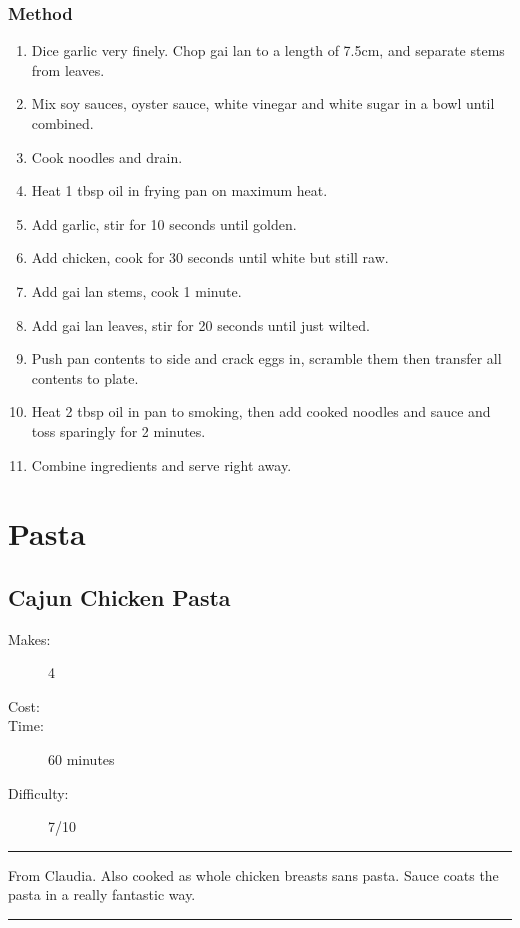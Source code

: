 \documentclass[]{article}
\begin{document}
\subsubsection*{\Large Method}
\begin{enumerate}[font=\huge\color{accent}]
	\item Dice garlic very finely. Chop gai lan to a length of 7.5cm, and separate stems from leaves.
	\item Mix soy sauces, oyster sauce, white vinegar and white sugar in a bowl until combined.
	\item Cook noodles and drain.
	\item Heat 1 tbsp oil in frying pan on maximum heat.
	\item Add garlic, stir for 10 seconds until golden.
	\item Add chicken, cook for 30 seconds until white but still raw.
	\item Add gai lan stems, cook 1 minute.
	\item Add gai lan leaves, stir for 20 seconds until just wilted.
	\item Push pan contents to side and crack eggs in, scramble them then transfer all contents to plate.
	\item Heat 2 tbsp oil in pan to smoking, then add cooked noodles and sauce and toss sparingly for 2 minutes.
	\item Combine ingredients and serve right away.
\end{enumerate}
\newpage
{}
\section*{\center\Huge\color{accent}Pasta}
\label{cat:Pasta}
\label{rec:Cajun Chicken Pasta}
\subsection*{\center\huge Cajun Chicken Pasta}
\begin{description}
\item[Makes:] 4 
\item[Cost:] \textdollar
\item[Time:] 60 minutes
\item[Difficulty:] 7/10
\end{description}
\vspace{0.2cm}\hrule\vspace{0.5cm}
\begin{adjustwidth}{0.5 cm}{0.5 cm}

From Claudia. Also cooked as whole chicken breasts sans pasta. Sauce coats the pasta in a really fantastic way. \hfill\color{accent}{\Large\faTruck\hspace{0.1cm}}\color{black}

\end{adjustwidth}
\vspace{0.5cm}\hrule
\end{document}
